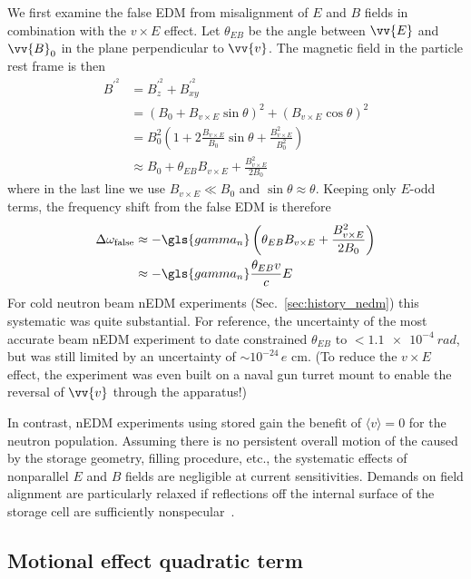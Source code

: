 We first examine the false EDM from misalignment of $E$ and $B$ fields in combination with the $v\times E$ effect. Let $\theta_{EB}$ be the angle between $\vv{E}$ and $\vv{B}_0$ in the plane perpendicular to $\vv{v}$. The magnetic field in the particle rest frame is then~\cite{lamoreaux_experimental_2009}
%
\begin{align}
    B^{\prime^2} &= B^{\prime^2}_z + B^{\prime^2}_{xy} \\
    &= (B_0 +  B_{v\times E}\sin\theta)^2 + ( B_{v\times E}\cos\theta)^2 \\
    &= B_0^2\left(1 + 2\frac{ B_{v\times E}}{B_0}\sin\theta + \frac{ B_{v\times E}^2}{B_0^2}\right)\\
    &\approx B_0 + \theta_{EB} B_{v\times E} + \frac{B_{v\times E}^2}{2B_0}
\end{align}
%
where in the last line we use $B_{v\times E} \ll B_0$ and $\sin\theta\approx\theta$. Keeping only $E$-odd terms, the frequency shift from the false EDM is therefore
%
\begin{align}
    \Delta\omega_\text{false} &\approx -\gls{gamma_n}\left( \theta_{EB} B_{v\times E} + \frac{B_{v\times E}^2}{2B_0} \right) \label{eq:vxE_motional_shift}\\
    &\approx -\gls{gamma_n} \frac{\theta_{EB}v}{c}E 
\end{align}
%
For cold neutron beam nEDM experiments (Sec.~\ref{sec:history_nedm}) this systematic was quite substantial. For reference, the uncertainty of the most accurate beam nEDM experiment to date \cite{dress_nedm_1977} constrained $\theta_{EB}$ to $<\qty{1.1e-4}{rad}$, but was still limited by an uncertainty of $\sim 10^{-24}\,e\text{ cm}$. (To reduce the $v\times E$ effect, the experiment was even built on a naval gun turret mount to enable the reversal of $\vv{v}$ through the apparatus!) 

In contrast, nEDM experiments using stored \ucn gain the benefit of $\langle v \rangle =0$ for the neutron population. Assuming there is no persistent overall motion of the \ucn caused by the storage geometry, filling procedure, etc., the systematic effects of nonparallel $E$ and $B$ fields are negligible at current sensitivities. Demands on field alignment are particularly relaxed if \ucn reflections off the internal surface of the storage cell are sufficiently nonspecular~\cite{pendlebury_revised_2015}.

\subsection*{Motional effect quadratic term}

